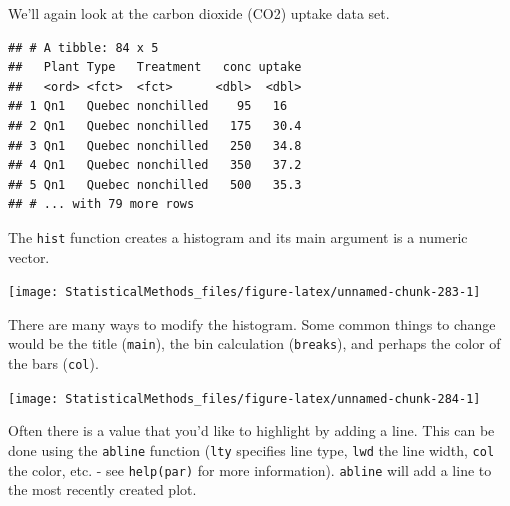 \documentclass[
]{book}
\newenvironment{Shaded}{\begin{snugshade}}{\end{snugshade}}
\newcommand{\DataTypeTok}[1]{\textcolor[rgb]{0.13,0.29,0.53}{#1}}
\newcommand{\DecValTok}[1]{\textcolor[rgb]{0.00,0.00,0.81}{#1}}
\newcommand{\KeywordTok}[1]{\textcolor[rgb]{0.13,0.29,0.53}{\textbf{#1}}}
\newcommand{\NormalTok}[1]{#1}
\newcommand{\OperatorTok}[1]{\textcolor[rgb]{0.81,0.36,0.00}{\textbf{#1}}}
\newcommand{\StringTok}[1]{\textcolor[rgb]{0.31,0.60,0.02}{#1}}
\theoremstyle{definition}
\theoremstyle{definition}
\theoremstyle{definition}
\theoremstyle{remark}
\begin{document}
We'll again look at the carbon dioxide (CO2) uptake data set.

\begin{verbatim}
## # A tibble: 84 x 5
##   Plant Type   Treatment   conc uptake
##   <ord> <fct>  <fct>      <dbl>  <dbl>
## 1 Qn1   Quebec nonchilled    95   16  
## 2 Qn1   Quebec nonchilled   175   30.4
## 3 Qn1   Quebec nonchilled   250   34.8
## 4 Qn1   Quebec nonchilled   350   37.2
## 5 Qn1   Quebec nonchilled   500   35.3
## # ... with 79 more rows
\end{verbatim}

The \texttt{hist} function creates a histogram and its main argument is a numeric vector.

\begin{Shaded}
\end{Shaded}

\begin{center}\texttt{[image: StatisticalMethods\_files/figure-latex/unnamed-chunk-283-1]} \end{center}

There are many ways to modify the histogram. Some common things to change would be the title (\texttt{main}), the bin calculation (\texttt{breaks}), and perhaps the color of the bars (\texttt{col}).

\begin{Shaded}
\end{Shaded}

\begin{center}\texttt{[image: StatisticalMethods\_files/figure-latex/unnamed-chunk-284-1]} \end{center}

Often there is a value that you'd like to highlight by adding a line. This can be done using the \texttt{abline} function (\texttt{lty} specifies line type, \texttt{lwd} the line width, \texttt{col} the color, etc. - see \texttt{help(par)} for more information). \texttt{abline} will add a line to the most recently created plot.
\end{document}
